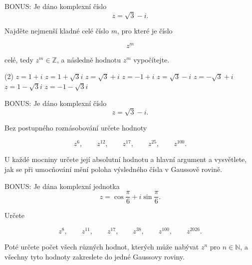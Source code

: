 \documentclass[12pt,a4paper]{article}
\begin{document}
\begin{exercise}
    BONUS: Je dáno komplexní číslo
    \[
        z=\sqrt3-i.
    \]
    
    Najděte nejmenší kladné celé číslo $m$, pro které je číslo
    
    \[
        z^m
    \]
    
    celé, tedy $z^m\in\mathbb{Z}$, a následně hodnotu $z^m$ vypočítejte.
\end{exercise}


\begin{exercise}
    \begin{tasks}(2)
        \task $z=1+i$
        \task $z=1+\sqrt3 i$
        \task $z=\sqrt3+i$
        \task $z=-1+i$
        \task $z=\sqrt3-i$
        \task $z=-\sqrt3+i$
        \task $z=1-\sqrt3 i$
        \task $z=-1-\sqrt3 i$
    \end{tasks}
\end{exercise}


\begin{exercise}[BONUS: Mocniny čísla $z=\sqrt3-i$]
    BONUS: Je dáno komplexní číslo
    \[
        z=\sqrt3-i.
    \]
    
    Bez postupného roznásobování určete hodnoty
    
    \[
        z^6,\qquad
        z^{12},\qquad
        z^{17},\qquad
        z^{25},\qquad
        z^{100}.
    \]
    
    U každé mocniny určete její absolutní hodnotu a hlavní argument a vysvětlete,
    jak se při umocňování mění poloha výsledného čísla v Gaussově rovině.
\end{exercise}


\begin{exercise}
    BONUS: Je dána komplexní jednotka
    \[
        z=
        \cos\frac{\pi}{6}
        +
        i\sin\frac{\pi}{6}.
    \]
    
    Určete
    
    \[
        z^8,\qquad
        z^{11},\qquad
        z^{17},\qquad
        z^{38},\qquad
        z^{100},\qquad
        z^{2026}.
    \]
    
    Poté určete počet všech různých hodnot, kterých může nabývat $z^n$ pro
    $n\in\mathbb{N}$, a všechny tyto hodnoty zakreslete do jedné Gaussovy roviny.
\end{exercise}
\end{document}
